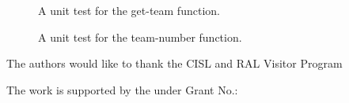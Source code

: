 




%





\begin{figure}
  
  \caption{A unit test for the get-team function.\label{fig:get-team-test}}
\end{figure}

%

\begin{figure}
  
  \caption{A unit test for the team-number function.\label{fig:team-number-test}}
\end{figure}


\begin{acks}
  The authors would like to thank the CISL and RAL Visitor Program

  The work is
  supported by the  under Grant
  No.:~

\end{acks}
